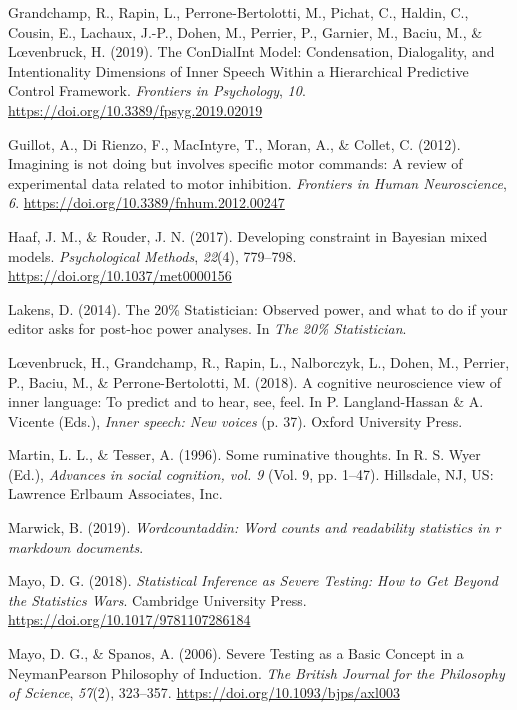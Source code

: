 \documentclass[
  english,
  man, donotrepeattitle,floatsintext]{apa6}
\newlength{\cslhangindent}
\newenvironment{cslreferences}%
  {\setlength{\parindent}{0pt}%
  \everypar{\setlength{\hangindent}{\cslhangindent}}\ignorespaces}%
  {\par}
\begin{document}
\begin{cslreferences}
\leavevmode\hypertarget{ref-grandchamp_condialint_2019}{}%
Grandchamp, R., Rapin, L., Perrone-Bertolotti, M., Pichat, C., Haldin, C., Cousin, E., Lachaux, J.-P., Dohen, M., Perrier, P., Garnier, M., Baciu, M., \& Lœvenbruck, H. (2019). The ConDialInt Model: Condensation, Dialogality, and Intentionality Dimensions of Inner Speech Within a Hierarchical Predictive Control Framework. \emph{Frontiers in Psychology}, \emph{10}. \url{https://doi.org/10.3389/fpsyg.2019.02019}

\leavevmode\hypertarget{ref-guillot_imagining_2012}{}%
Guillot, A., Di Rienzo, F., MacIntyre, T., Moran, A., \& Collet, C. (2012). Imagining is not doing but involves specific motor commands: A review of experimental data related to motor inhibition. \emph{Frontiers in Human Neuroscience}, \emph{6}. \url{https://doi.org/10.3389/fnhum.2012.00247}

\leavevmode\hypertarget{ref-haaf_developing_2017}{}%
Haaf, J. M., \& Rouder, J. N. (2017). Developing constraint in Bayesian mixed models. \emph{Psychological Methods}, \emph{22}(4), 779--798. \url{https://doi.org/10.1037/met0000156}

\leavevmode\hypertarget{ref-lakens_20_2014}{}%
Lakens, D. (2014). The 20\% Statistician: Observed power, and what to do if your editor asks for post-hoc power analyses. In \emph{The 20\% Statistician}.

\leavevmode\hypertarget{ref-loevenbruck_cognitive_2018}{}%
Lœvenbruck, H., Grandchamp, R., Rapin, L., Nalborczyk, L., Dohen, M., Perrier, P., Baciu, M., \& Perrone-Bertolotti, M. (2018). A cognitive neuroscience view of inner language: To predict and to hear, see, feel. In P. Langland-Hassan \& A. Vicente (Eds.), \emph{Inner speech: New voices} (p. 37). Oxford University Press.

\leavevmode\hypertarget{ref-Martin}{}%
Martin, L. L., \& Tesser, A. (1996). Some ruminative thoughts. In R. S. Wyer (Ed.), \emph{Advances in social cognition, vol. 9} (Vol. 9, pp. 1--47). Hillsdale, NJ, US: Lawrence Erlbaum Associates, Inc.

\leavevmode\hypertarget{ref-R-wordcountaddin}{}%
Marwick, B. (2019). \emph{Wordcountaddin: Word counts and readability statistics in r markdown documents}.

\leavevmode\hypertarget{ref-mayo_statistical_2018}{}%
Mayo, D. G. (2018). \emph{Statistical Inference as Severe Testing: How to Get Beyond the Statistics Wars}. Cambridge University Press. \url{https://doi.org/10.1017/9781107286184}

\leavevmode\hypertarget{ref-mayo_severe_2006}{}%
Mayo, D. G., \& Spanos, A. (2006). Severe Testing as a Basic Concept in a NeymanPearson Philosophy of Induction. \emph{The British Journal for the Philosophy of Science}, \emph{57}(2), 323--357. \url{https://doi.org/10.1093/bjps/axl003}


\end{cslreferences}
\end{document}
